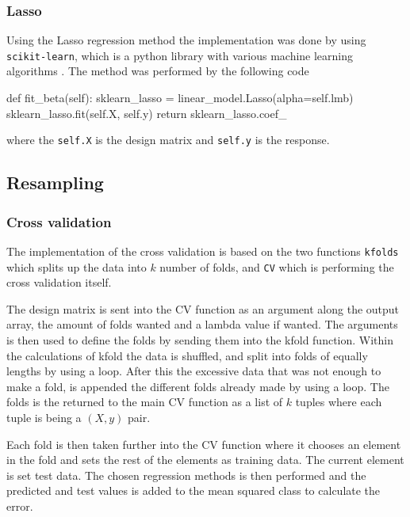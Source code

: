 \documentclass[../main.tex]{subfiles}
\begin{document}
\subsubsection{Lasso}
Using the Lasso regression method the implementation was done by using \verb|scikit-learn|, which is a python library with various machine learning algorithms \cite{scikitlearn}. The method was performed by the following code
\begin{python}
    def fit_beta(self):
        sklearn_lasso = linear_model.Lasso(alpha=self.lmb)
        sklearn_lasso.fit(self.X, self.y)
        return sklearn_lasso.coef_
\end{python}
where the \verb|self.X| is the design matrix and \verb|self.y| is the response.

\subsection{Resampling}
\subsubsection{Cross validation}
The implementation of the cross validation is based on the two functions \verb|kfolds| which splits up the data into $k$ number of folds, and \verb|CV| which is performing the cross validation itself.

The design matrix is sent into the CV function as an argument along the output array, the amount of folds wanted and a lambda value if wanted. The arguments is then used to define the folds by sending them into the kfold function. Within the calculations of kfold the data is shuffled, and split into folds of equally lengths by using a loop. After this the excessive data that was not enough to make a fold, is appended the different folds already made by using a loop. The folds is the returned to the main CV function as a list of $k$ tuples where each tuple is being a $(X, y)$ pair.

Each fold is then taken further into the CV function where it chooses an element in the fold and sets the rest of the elements as training data. The current element is set test data. The chosen regression methods is then performed and the predicted and test values is added to the mean squared class to calculate the error.
\end{document}
